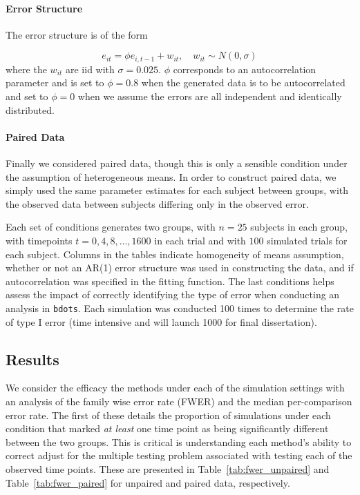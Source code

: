 \documentclass{article}
\newcommand{\xt}{\texttt}
\begin{document}
\paragraph{Error Structure} The error structure is of the form

\begin{equation}
e_{it} = \phi e_{i, t-1} + w_{it}, \quad w_{it} \sim N(0, \sigma)
\end{equation}
where the $w_{it}$ are iid with $\sigma = 0.025$. $\phi$ corresponds to an autocorrelation parameter and is set to $\phi = 0.8$ when the generated data is to be autocorrelated and set to $\phi = 0$ when we assume the errors are all independent and identically distributed. 

\paragraph{Paired Data} Finally we considered paired data, though this is only a sensible condition under the assumption of heterogeneous means. In order to construct paired data, we simply used the same parameter estimates for each subject between groups, with the observed data between subjects differing only in the observed error.


Each set of conditions generates two groups, with $n = 25$ subjects in each group, with timepoints $t = 0, 4, 8, \dots, 1600$ in each trial and with $100$ simulated trials for each subject. Columns in the tables indicate homogeneity of means assumption, whether or not an AR(1) error structure was used in constructing the data, and if autocorrelation was specified in the fitting function. The last conditions helps assess the impact of correctly identifying the type of error when conducting an analysis in \xt{bdots}. Each simulation was conducted 100 times to determine the rate of type I error (time intensive and will launch 1000 for final dissertation). 


\subsection{Results}

We consider the efficacy the methods under each of the simulation settings with an analysis of the family wise error rate (FWER) and the median per-comparison error rate. The first of these details the proportion of simulations under each condition that marked \textit{at least} one time point as being significantly different between the two groups. This is critical is understanding each method's ability to correct adjust for the multiple testing problem associated with testing each of the observed time points. These are presented in Table~\ref{tab:fwer_unpaired} and Table~\ref{tab:fwer_paired} for unpaired and paired data, respectively.
\end{document}
